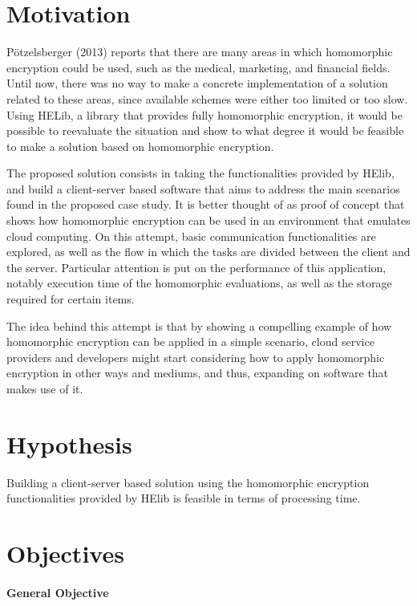 \section{Motivation}

P{\"o}tzelsberger (2013) \cite{potzelsberger2013kv} reports that there are many areas in which homomorphic encryption could be used, such as the medical, marketing, and financial fields. Until now, there was no way to make a concrete implementation of a solution related to these areas, since available schemes were either too limited or too slow. Using HELib, a library that provides fully homomorphic encryption, it would be possible to reevaluate the situation and show to what degree it would be feasible to make a solution based on homomorphic encryption.

The proposed solution consists in taking the functionalities provided by HElib, and build a client-server based software that aims to address the main scenarios found in the proposed case study. It is better thought of as proof of concept that shows how homomorphic encryption can be used in an environment that emulates cloud computing. On this attempt, basic communication functionalities are explored, as well as the flow in which the tasks are divided between the client and the server. Particular attention is put on the performance of this application, notably execution time of the homomorphic evaluations, as well as the storage required for certain items.

The idea behind this attempt is that by showing a compelling example of how homomorphic encryption can be applied in a simple scenario, cloud service providers and developers might start considering how to apply homomorphic encryption in other ways and mediums, and thus, expanding on software that makes use of it.

\section{Hypothesis}

Building a client-server based solution using the homomorphic encryption functionalities provided by HElib is feasible in terms of processing time.

\section{Objectives}

\paragraph{General Objective}


